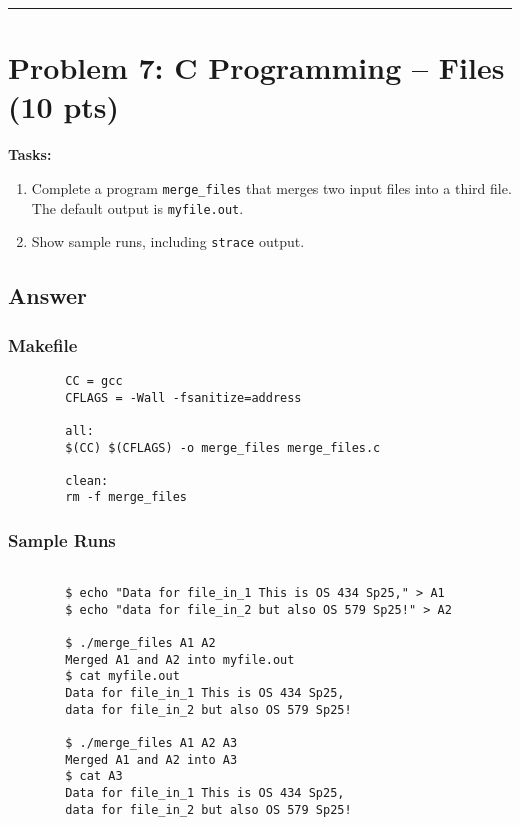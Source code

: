 \documentclass[12pt]{article}
\begin{document}
	\hrule
	\vspace{0.5cm}
	
	\section{Problem 7: C Programming -- Files (10 pts)}
	\textbf{Tasks:}
	\begin{enumerate}
		\item Complete a program \texttt{merge\_files} that merges two input files into a third file. The default output is \texttt{myfile.out}.
		\item Show sample runs, including \texttt{strace} output.
	\end{enumerate}
	
	\subsection*{Answer}
	
	
	
	\subsubsection*{Makefile}
	\begin{lstlisting}
		CC = gcc
		CFLAGS = -Wall -fsanitize=address
		
		all:
		$(CC) $(CFLAGS) -o merge_files merge_files.c
		
		clean:
		rm -f merge_files
	\end{lstlisting}
	
	\subsubsection*{Sample Runs}
	\begin{verbatim}
		
		$ echo "Data for file_in_1 This is OS 434 Sp25," > A1
		$ echo "data for file_in_2 but also OS 579 Sp25!" > A2
		
		$ ./merge_files A1 A2
		Merged A1 and A2 into myfile.out
		$ cat myfile.out
		Data for file_in_1 This is OS 434 Sp25,
		data for file_in_2 but also OS 579 Sp25!
		
		$ ./merge_files A1 A2 A3
		Merged A1 and A2 into A3
		$ cat A3
		Data for file_in_1 This is OS 434 Sp25,
		data for file_in_2 but also OS 579 Sp25!
	\end{verbatim}
	
\end{document}
